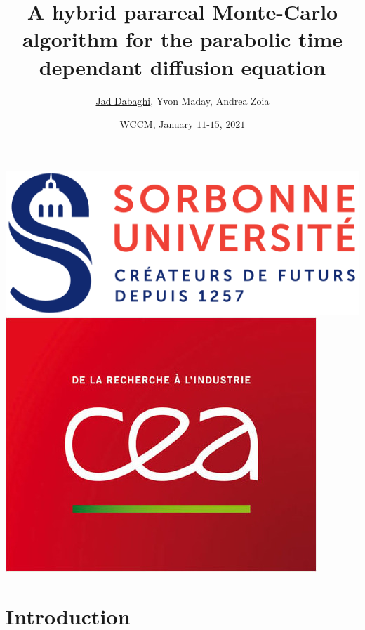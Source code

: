 \documentclass[10 pt]{beamer}
\title[SIAM GS 2019]{A hybrid parareal Monte-Carlo algorithm for the parabolic time
dependant diffusion equation}
\author[Jad Dabaghi]
{\underline{Jad Dabaghi}, Yvon Maday, Andrea Zoia}
\institute[]{Sorbonne Université \& CEA Paris Saclay}
\date{WCCM, January $11$-$15$, $2021$}
\begin{document}
\begin{frame}
\maketitle
\includegraphics[scale=0.2]{image/logo_sorbonne}
\hfill \includegraphics[scale=0.14]{image/CEA}

\end{frame}




\newcommand{\kk}{\textcolor{royalblue}{k}}
\newcommand{\ii}{\textcolor{burntorange}{i}}
\newcommand{\nuu}{\textcolor{burntorange}{\nu}}


\setcounter{tocdepth}{4}
\section{Introduction}
\end{document}
